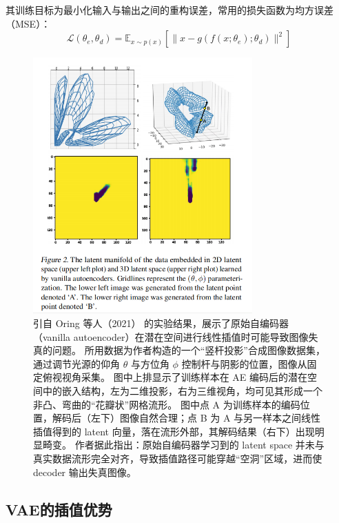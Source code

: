 \documentclass[12pt,a4paper]{article}
\begin{document}
其训练目标为最小化输入与输出之间的重构误差，常用的损失函数为均方误差（MSE）：
\[
\mathcal{L}(\theta_e, \theta_d) = \mathbb{E}_{x \sim p(x)} \left[ \| x - g(f(x; \theta_e); \theta_d) \|^2 \right]
\]

\begin{figure}[H]
  \centering
  \includegraphics[width=0.75\textwidth]{../images/re1.png}
  \caption{
    引自 Oring 等人（2021）\cite{oring2021interpolation} 的实验结果，展示了原始自编码器（vanilla autoencoder）在潜在空间进行线性插值时可能导致图像失真的问题。
    所用数据为作者构造的一个“竖杆投影”合成图像数据集，通过调节光源的仰角 $\theta$ 与方位角 $\phi$ 控制杆与阴影的位置，图像从固定俯视视角采集。
    图中上排显示了训练样本在 AE 编码后的潜在空间中的嵌入结构，左为二维投影，右为三维视角，均可见其形成一个非凸、弯曲的“花瓣状”网格流形。
    图中点 A 为训练样本的编码位置，解码后（左下）图像自然合理；点 B 为 A 与另一样本之间线性插值得到的 latent 向量，落在流形外部，其解码结果（右下）出现明显畸变。
    作者据此指出：原始自编码器学习到的 latent space 并未与真实数据流形完全对齐，导致插值路径可能穿越“空洞”区域，进而使 decoder 输出失真图像。
  }
  \label{fig:re1}
\end{figure}


\subsection{VAE的插值优势}
\end{document}
